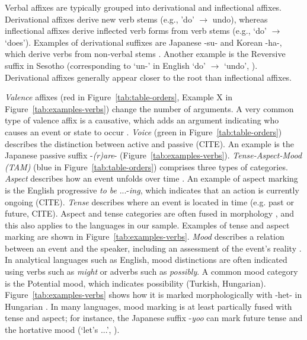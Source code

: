 \documentclass[11pt,letterpaper]{article}
\newcommand{\citep}{\parencite}
\begin{document}
Verbal affixes are typically grouped into derivational and inflectional affixes.
Derivational affixes derive new verb stems (e.g., 'do' $\rightarrow$ undo), whereas inflectional affixes derive inflected verb forms from verb stems (e.g., `do' $\rightarrow$ `does').
Examples of derivational suffixes are Japanese -su- and Korean -ha-, which derive verbs from non-verbal stems \citep{hasegawa2014japanese, yeon2010korean}.
Another example is the Reversive suffix in Sesotho (corresponding to `un-' in English `do' $\rightarrow$ `undo', \citep{doke1967textbook}).
Derivational affixes generally appear closer to the root than inflectional affixes.

\textit{Valence} affixes (red in Figure~\ref{tab:table-orders}, Example X in Figure~\ref{tab:examples-verbs}) change the number of arguments. A very common type of valence affix is a causative, which adds an argument indicating who causes an event or state to occur \citep{wals-111}.
\textit{Voice} (green in Figure~\ref{tab:table-orders}) describes the distinction between active and passive (CITE). An example is the Japanese passive suffix -\textit{(r)are}- (Figure~\ref{tab:examples-verbs}).
\textit{Tense-Aspect-Mood (TAM)} (blue in Figure~\ref{tab:table-orders}) comprises three types of categories.
\textit{Aspect} describes how an event unfolds over time \citep{comrie1976aspect,dahl1985tense,binnick1991time}.
An example of aspect marking is the English progressive \textit{to be} ...-\textit{ing}, which indicates that an action is currently ongoing (CITE).
\textit{Tense} describes where an event is located in time (e.g. past or future, CITE).
Aspect and tense categories are often fused in morphology \citep{binnick2012the}, and this also applies to the languages in our sample.
Examples of tense and aspect marking are shown in Figure~\ref{tab:examples-verbs}.
\textit{Mood} describes a relation between an event and the speaker, including an assessment of the event's reality \cite{palmer1986mood,portner2018mood}.
In analytical languages such as English, mood distinctions are often indicated using verbs such as \textit{might} or adverbs such as \textit{possibly}.
A common mood category is the Potential mood, which indicates possibility (Turkish, Hungarian).
Figure~\ref{tab:examples-verbs} shows how it is marked morphologically with -het- in Hungarian \citep{rounds2001hungarian}.
In many languages, mood marking is at least partically fused with tense and aspect; for instance, the Japanese suffix -\textit{yoo} can mark future tense and the hortative mood (`let's ...', \citep{hasegawa2014japanese}).
\end{document}
